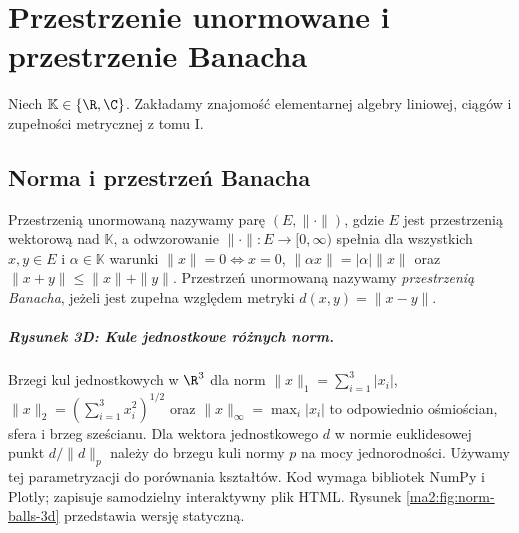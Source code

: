 \chapter{Przestrzenie unormowane i przestrzenie Banacha}
\label{ma2:ch:normed}
\providecommand{\K}{\mathbb K}
Niech $\K\in\{\R,\C\}$. Zakładamy znajomość elementarnej
algebry liniowej, ciągów i zupełności metrycznej z tomu I.
\section{Norma i przestrzeń Banacha}
\begin{definicja}
\label{def:banach12}
Przestrzenią unormowaną nazywamy parę $(E,\|\cdot\|)$, gdzie $E$
jest przestrzenią wektorową nad $\K$, a odwzorowanie
$\|\cdot\|:E\to[0,\infty)$ spełnia dla wszystkich $x,y\in E$
i $\alpha\in\K$ warunki
$\|x\|=0\iff x=0$, $\|\alpha x\|=|\alpha|\|x\|$ oraz
$\|x+y\|\le\|x\|+\|y\|$. Przestrzeń unormowaną nazywamy
\emph{przestrzenią Banacha}, jeżeli jest zupełna względem metryki
$d(x,y)=\|x-y\|$.
\end{definicja}

\paragraph{Rysunek 3D: Kule jednostkowe różnych norm.}
Brzegi kul jednostkowych w $\R^3$ dla norm
$\|x\|_1=\sum_{i=1}^3|x_i|$, $\|x\|_2=(\sum_{i=1}^3x_i^2)^{1/2}$
oraz $\|x\|_\infty=\max_i|x_i|$ to odpowiednio ośmiościan,
sfera i brzeg sześcianu. Dla wektora jednostkowego $d$
w normie euklidesowej punkt $d/\|d\|_p$ należy do brzegu
kuli normy $p$ na mocy jednorodności. Używamy tej
parametryzacji do porównania kształtów.
Kod wymaga bibliotek NumPy i Plotly; zapisuje samodzielny
interaktywny plik HTML.
Rysunek \ref{ma2:fig:norm-balls-3d} przedstawia wersję statyczną.

